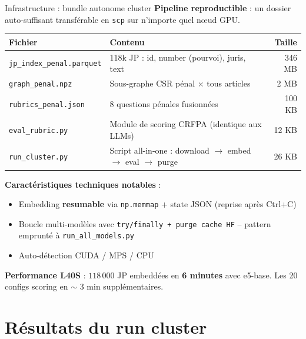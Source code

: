 \documentclass[aspectratio=169,10pt]{beamer}
\begin{document}
\begin{frame}{Infrastructure : bundle autonome cluster}
  \footnotesize
  \textbf{Pipeline reproductible} : un dossier auto-suffisant transférable en \texttt{scp} sur n'importe quel nœud GPU.

  \vspace{0.4em}
  \begin{tabular}{@{}l p{8cm} r@{}}
    \toprule
    \textbf{Fichier} & \textbf{Contenu} & \textbf{Taille} \\
    \midrule
    \texttt{jp\_index\_penal.parquet}  & 118k JP : id, number (pourvoi), juris, text & 346 MB \\
    \texttt{graph\_penal.npz}          & Sous-graphe CSR pénal $\times$ tous articles & 2 MB \\
    \texttt{rubrics\_penal.json}       & 8 questions pénales fusionnées & 100 KB \\
    \texttt{eval\_rubric.py}           & Module de scoring CRFPA (identique aux LLMs) & 12 KB \\
    \texttt{run\_cluster.py}           & Script all-in-one : download $\to$ embed $\to$ eval $\to$ purge & 26 KB \\
    \bottomrule
  \end{tabular}

  \vspace{0.4em}
  \textbf{Caractéristiques techniques notables} :
  \begin{itemize}\footnotesize
    \item Embedding \textbf{resumable} via \texttt{np.memmap} + state JSON (reprise après Ctrl+C)
    \item Boucle multi-modèles avec \texttt{try/finally + purge cache HF} -- pattern emprunté à \texttt{run\_all\_models.py}
    \item Auto-détection CUDA / MPS / CPU
  \end{itemize}

  \vspace{0.4em}
  \textbf{Performance L40S} : \(118\,000\) JP embeddées en \textbf{6 minutes} avec e5-base. Les 20 configs scoring en \(\sim\) 3 min supplémentaires.
\end{frame}

\section{Résultats du run cluster}
\end{document}
